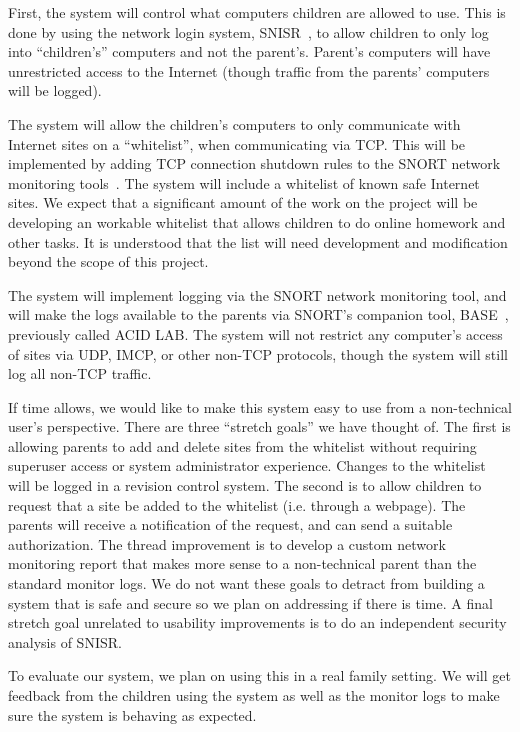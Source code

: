 \documentclass[12pt] {article}
\begin{document}
First, the system will control what computers children are allowed to use. This
is done by using the network login system, SNISR~\cite{snisr}, to allow
children to only log into ``children's'' computers and not the parent's.
Parent's computers will have unrestricted access to the Internet (though
traffic from the parents' computers will be logged).

The system will allow the children's computers to only communicate with
Internet sites on a ``whitelist'', when communicating via TCP.  This will be
implemented by adding TCP connection shutdown rules to the SNORT network
monitoring tools~\cite{snort}. The system will include a whitelist of known
safe Internet sites. We expect that a
significant amount of the work on the project will be developing an workable
whitelist that allows children to do online homework and other tasks. It is
understood that the list will need development and modification beyond the
scope of this project.

The system will implement logging via the SNORT network monitoring tool, and
will make the logs available to the parents via SNORT's companion tool,
BASE~\cite{base}, previously called ACID LAB. The system will
not restrict any computer's access of sites via UDP, IMCP, or other non-TCP
protocols, though the system will still log all non-TCP traffic.

If time allows, we would like to make this system easy to use from a
non-technical user's perspective. There are three ``stretch goals'' we have
thought of. The first is allowing parents to add and delete sites from the
whitelist without requiring superuser access or system administrator
experience. Changes to the whitelist will be logged in a revision control
system. The second is to allow children to request that a site be added to the
whitelist (i.e. through a webpage). The parents will receive a notification of
the request, and can send a suitable authorization. The thread improvement is
to develop a custom network monitoring report that makes more sense to a
non-technical parent than the standard monitor logs. We do not want these goals
to detract from building a system that is safe and secure so we plan on
addressing if there is time. A final stretch goal unrelated to usability
improvements is to do an independent security analysis of SNISR.

To evaluate our system, we plan on using this in a real family setting. We will
get feedback from the children using the system as well as the monitor logs to
make sure the system is behaving as expected.
\end{document}
